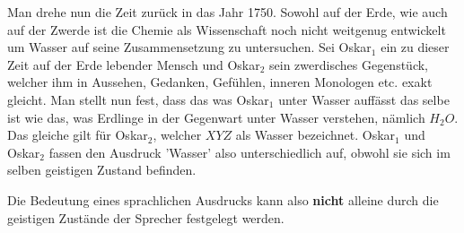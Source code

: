 \documentclass[a4paper]{article}
\begin{document}
Man drehe nun die Zeit zurück in das Jahr 1750. Sowohl auf der Erde, wie auch auf der Zwerde ist die Chemie als Wissenschaft noch nicht weitgenug entwickelt um Wasser auf seine Zusammensetzung zu untersuchen. Sei Oskar$_1$ ein zu dieser Zeit auf der Erde lebender Mensch und Oskar$_2$ sein zwerdisches Gegenstück, welcher ihm in Aussehen, Gedanken, Gefühlen, inneren Monologen etc. exakt gleicht. Man stellt nun fest, dass das was Oskar$_1$ unter Wasser auffässt das selbe ist wie das, was Erdlinge in der Gegenwart unter Wasser verstehen, nämlich $H_2 O$. Das gleiche gilt für Oskar$_2$, welcher $XYZ$ als Wasser bezeichnet. Oskar$_1$ und Oskar$_2$ fassen den Ausdruck 'Wasser' also unterschiedlich auf, obwohl sie sich im selben geistigen Zustand befinden.

Die Bedeutung eines sprachlichen Ausdrucks kann also \textbf{nicht} alleine durch die geistigen Zustände der Sprecher festgelegt werden.



\end{document}
